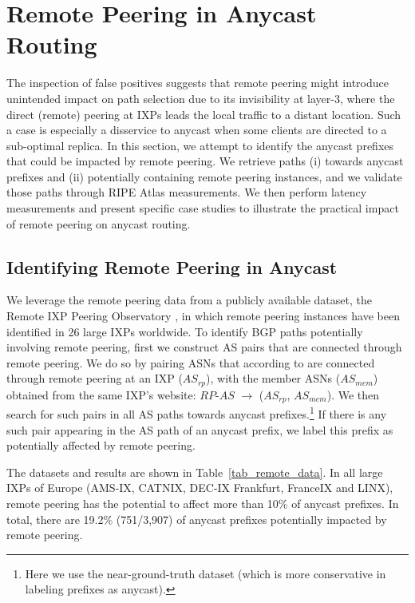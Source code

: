 
\section{Remote Peering in Anycast Routing}
\label{sec:rp}
The inspection of false positives suggests that remote peering might introduce unintended impact on path selection due to its invisibility at layer-3, where the direct (remote) peering at IXPs leads the local traffic to a distant location. Such a case is especially a disservice to anycast when some clients are directed to a sub-optimal replica. In this section, we attempt to identify the anycast prefixes that could be impacted by remote peering. We retrieve paths (i) towards anycast prefixes and (ii) potentially containing remote peering instances, and we validate those paths through RIPE Atlas measurements. We then perform latency measurements and present specific case studies to illustrate the practical impact of remote peering on anycast routing.

\subsection{Identifying Remote Peering in Anycast}
\label{sub:idRP}
We leverage the remote peering data from a publicly available dataset, the Remote IXP Peering Observatory \cite{RPJedi}, in which remote peering instances have been identified in 26 large IXPs worldwide.
To identify BGP paths potentially involving remote peering, first we construct
AS pairs that are connected through remote peering. We do so by pairing ASNs 
that according to \cite{RPJedi} are connected through remote peering
at an IXP ($AS_{rp}$), with the member ASNs ($AS_{mem}$)
obtained from the same IXP's website: $RP$-$AS$ $\to$ ($AS_{rp}$, $AS_{mem}$). 
We then search for such pairs in all AS paths towards anycast prefixes.\footnote{Here we use the near-ground-truth dataset (which is more conservative in labeling prefixes as anycast).} If there is any such pair appearing in the AS path of an anycast prefix, we label this prefix as potentially affected by remote peering. 

The datasets and results are shown in Table~\ref{tab_remote_data}. In all large IXPs of Europe (AMS-IX, CATNIX, DEC-IX Frankfurt, FranceIX and LINX), remote peering has the potential to affect more than 10\% of anycast prefixes. In total, there are 19.2\% (751/3,907) of anycast prefixes potentially impacted by remote peering.

